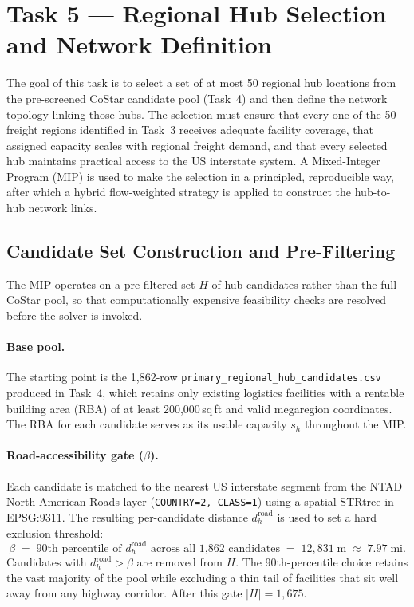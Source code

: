
\section{Task 5 — Regional Hub Selection and Network Definition}

The goal of this task is to select a set of at most 50 regional hub locations from the pre-screened CoStar candidate pool (Task~4) and then define the network topology linking those hubs. The selection must ensure that every one of the 50 freight regions identified in Task~3 receives adequate facility coverage, that assigned capacity scales with regional freight demand, and that every selected hub maintains practical access to the US interstate system. A Mixed-Integer Program (MIP) is used to make the selection in a principled, reproducible way, after which a hybrid flow-weighted strategy is applied to construct the hub-to-hub network links.

\subsection{Candidate Set Construction and Pre-Filtering}

The MIP operates on a pre-filtered set $H$ of hub candidates rather than the full CoStar pool, so that computationally expensive feasibility checks are resolved before the solver is invoked.

\paragraph{Base pool.}
The starting point is the 1,862-row \texttt{primary\_regional\_hub\_candidates.csv} produced in Task~4, which retains only existing logistics facilities with a rentable building area (RBA) of at least 200{,}000\,sq\,ft and valid megaregion coordinates. The RBA for each candidate serves as its usable capacity $s_h$ throughout the MIP.

\paragraph{Road-accessibility gate ($\beta$).}
Each candidate is matched to the nearest US interstate segment from the NTAD North American Roads layer (\texttt{COUNTRY=2, CLASS=1}) using a spatial STRtree in EPSG:9311. The resulting per-candidate distance $d_h^{\text{road}}$ is used to set a hard exclusion threshold:
\begin{equation}
    \beta \;=\; \text{90th percentile of } d_h^{\text{road}} \text{ across all 1{,}862 candidates} \;=\; 12{,}831\;\text{m} \;\approx\; 7.97\;\text{mi.}
\end{equation}
Candidates with $d_h^{\text{road}} > \beta$ are removed from $H$. The 90th-percentile choice retains the vast majority of the pool while excluding a thin tail of facilities that sit well away from any highway corridor. After this gate $|H| = 1{,}675$.

